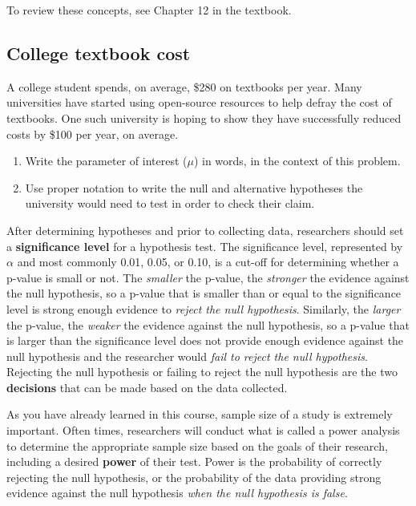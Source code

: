 \documentclass[
]{report}
\begin{document}
To review these concepts, see Chapter 12 in the textbook.

\subsection{College textbook cost}\label{college-textbook-cost}

A college student spends, on average, \$280 on textbooks per year. Many universities have started using open-source resources to help defray the cost of textbooks. One such university is hoping to show they have successfully reduced costs by \$100 per year, on average.

\begin{enumerate}
\def\labelenumi{\arabic{enumi}.}
\item
  Write the parameter of interest (\(\mu\)) in words, in the context of this problem.
  \vspace{0.5in}
\item
  Use proper notation to write the null and alternative hypotheses the university would need to test in order to check their claim.
  \vspace{0.5in}
\end{enumerate}

After determining hypotheses and prior to collecting data, researchers should set a \textbf{significance level} for a hypothesis test. The significance level, represented by \(\alpha\) and most commonly 0.01, 0.05, or 0.10, is a cut-off for determining whether a p-value is small or not. The \emph{smaller} the p-value, the \emph{stronger} the evidence against the null hypothesis, so a p-value that is smaller than or equal to the significance level is strong enough evidence to \emph{reject the null hypothesis}. Similarly, the \emph{larger} the p-value, the \emph{weaker} the evidence against the null hypothesis, so a p-value that is larger than the significance level does not provide enough evidence against the null hypothesis and the researcher would \emph{fail to reject the null hypothesis}. Rejecting the null hypothesis or failing to reject the null hypothesis are the two \textbf{decisions} that can be made based on the data collected.

As you have already learned in this course, sample size of a study is extremely important. Often times, researchers will conduct what is called a power analysis to determine the appropriate sample size based on the goals of their research, including a desired \textbf{power} of their test. Power is the probability of correctly rejecting the null hypothesis, or the probability of the data providing strong evidence against the null hypothesis \emph{when the null hypothesis is false}.
\end{document}
